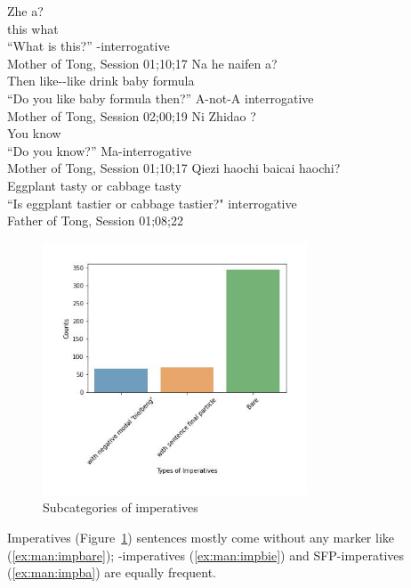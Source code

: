 \bxl\label{ex:man:int:wh}
\gll Zhe  a?\\
this what \Sfp{}\\
``What is this?'' \hfill  \twh-interrogative\\Mother of Tong, Session 01;10;17
\ex\label{ex:man:int:anota}
\gll Na  he naifen a?\\
Then like-\Neg-like drink {baby formula} \Sfp{}\\
\trans ``Do you like {baby formula} then?'' \hfill A-not-A interrogative\\
Mother of Tong, Session 02;00;19
\ex\label{ex:man:int:ma}
\gll Ni Zhidao ?\\
You know \\
\trans ``Do you know?'' \hfill Ma-interrogative\\Mother of Tong, Session 01;10;17
\ex\label{ex:man:int:haishi}
\gll Qiezi haochi  baicai haochi?\\
Eggplant tasty or cabbage tasty\\
\trans ``Is eggplant tastier or cabbage tastier?"\hfill {} interrogative\\Father of Tong, Session 01;08;22
\exl
\eex

\begin{figure}[H]
    \centering
    \includegraphics[width=0.7\textwidth]{figures/man-real-subimp.jpg}
    \caption{Subcategories of imperatives}
    \label{fig:man:real-subimp}
\end{figure}

Imperatives (Figure~\ref{fig:man:real-subimp}) sentences mostly come without any marker like (\ref{ex:man:impbare}); -imperatives (\ref{ex:man:impbie}) and SFP-imperatives (\ref{ex:man:impba}) are equally frequent. 


